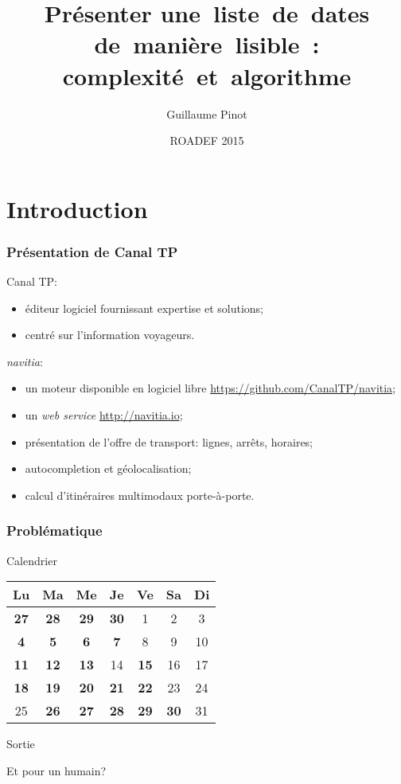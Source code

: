 \documentclass[table]{beamer}
\title[Présenter une~liste~de~dates de~manière~lisible]
{Présenter une~liste~de~dates de~manière~lisible~:
  complexité~et~algorithme}
\author{Guillaume Pinot}
\institute[Canal TP] %
{
  Canal TP\\
  20 rue Hector Malot\\
  75012 Paris, France\\
  \texttt{guillaume.pinot@canaltp.fr}}
\date{ROADEF 2015}
\newcommand{\+}{\cellcolor[gray]{1}\bfseries}
\newcommand{\<}{\cellcolor[gray]{0.8}\rmfamily\itshape}
\newcommand*{\foreign}[2][english]{%
    \emph{\foreignlanguage{#1}{#2}}%
}
\begin{document}
\begin{frame}
  \titlepage    
\end{frame}

\section*{Introduction}

\begin{frame}
  \frametitle{Présentation de Canal TP}

  Canal TP:
  \begin{itemize}
  \item éditeur logiciel fournissant expertise et solutions;
  \item centré sur l'information voyageurs.
  \end{itemize}

  \emph{navitia}:
  \begin{itemize}
  \item un moteur disponible en logiciel libre
    \url{https://github.com/CanalTP/navitia};
  \item un \foreign{web service} \url{http://navitia.io};
  \item présentation de l'offre de transport: lignes, arrêts, horaires;
  \item autocompletion et géolocalisation;
  \item calcul d'itinéraires multimodaux porte-à-porte.
  \end{itemize}
\end{frame}

\begin{frame}
  \frametitle{Problématique}

  \begin{block}{Calendrier}
    \centering
    \begin{tabular}{|ccccccc|}
      \hline
      Lu  & Ma & Me & Je & Ve & Sa & Di\\
      \hline
      \+27&\+28&\+29&\+30&  1 &  2 &  3\\
      \+4 & \+5& \+6& \+7&  8 &  9 & 10\\
      \+11&\+12&\+13& 14 &\+15& 16 & 17\\
      \+18&\+19&\+20&\+21&\+22& 23 & 24\\
      25  &\+26&\+27&\+28&\+29&\+30& 31\\
      \hline
    \end{tabular}
  \end{block}

  \begin{block}{Sortie}
  \end{block}

  Et pour un humain?
\end{frame}
\end{document}
